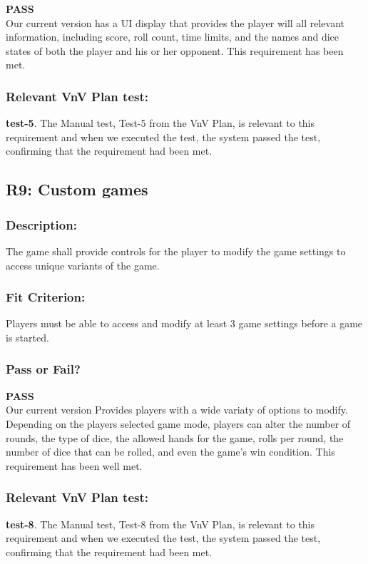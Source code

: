 \documentclass[12pt, titlepage]{article}
\begin{document}
 \noindent \textbf{PASS}\\
 
 \noindent Our current version has a UI display that provides the player will all relevant information, including score, roll count, time limits, and the names and dice states of both the player and his or her opponent. This requirement has been met.

\subsubsection{Relevant VnV Plan test: } \textbf{test-5}.  The Manual test, Test-5 from the VnV Plan, is relevant to this requirement and when we executed the test, the system passed the test, confirming that the requirement had been met.

\subsection{R9: Custom games} 

\subsubsection{Description:}The game shall provide controls for the player to modify the game settings to access unique variants of the game.

\subsubsection{Fit Criterion:}Players must be able to access and modify at least 3 game settings before a game is started.

\subsubsection{Pass or Fail?} 

 \noindent \textbf{PASS}\\
 
 \noindent Our current version Provides players with a wide variaty of options to modify. Depending on the players selected game mode, players can alter the number of rounds, the type of dice, the allowed hands for the game, rolls per round, the number of dice that can be rolled, and even the game's win condition. This requirement has been well met.

\subsubsection{Relevant VnV Plan test: } \textbf{test-8}.  The Manual test, Test-8 from the VnV Plan, is relevant to this requirement and when we executed the test, the system passed the test, confirming that the requirement had been met.
\end{document}
